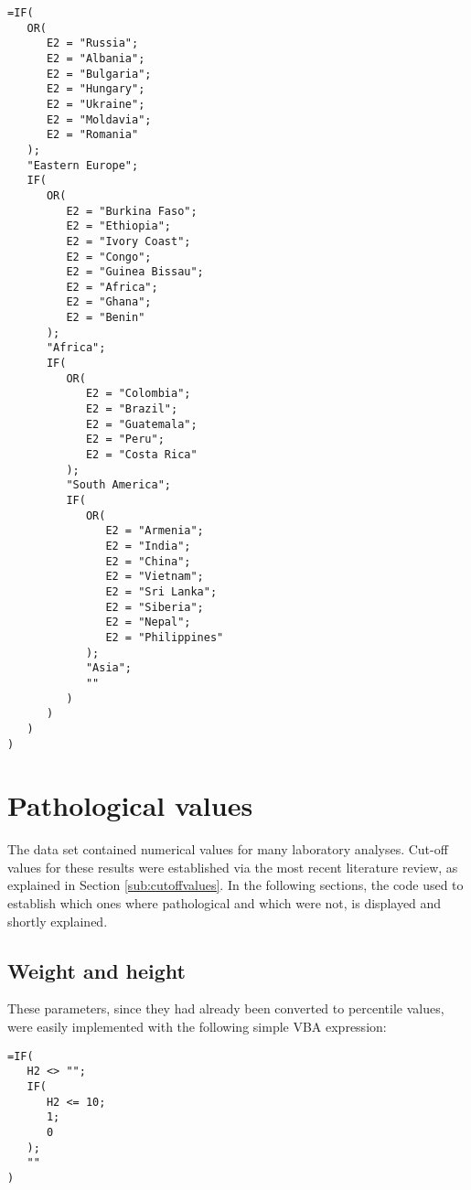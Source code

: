 \begin{lstlisting}
=IF(
   OR(
      E2 = "Russia";
      E2 = "Albania";
      E2 = "Bulgaria";
      E2 = "Hungary";
      E2 = "Ukraine";
      E2 = "Moldavia";
      E2 = "Romania"
   );
   "Eastern Europe";
   IF(
      OR(
         E2 = "Burkina Faso";
         E2 = "Ethiopia";
         E2 = "Ivory Coast";
         E2 = "Congo";
         E2 = "Guinea Bissau";
         E2 = "Africa";
         E2 = "Ghana";
         E2 = "Benin"
      );
      "Africa";
      IF(
         OR(
            E2 = "Colombia";
            E2 = "Brazil";
            E2 = "Guatemala";
            E2 = "Peru";
            E2 = "Costa Rica"
         );
         "South America";
         IF(
            OR(
               E2 = "Armenia";
               E2 = "India";
               E2 = "China";
               E2 = "Vietnam";
               E2 = "Sri Lanka";
               E2 = "Siberia";
               E2 = "Nepal";
               E2 = "Philippines"
            );
            "Asia";
            ""
         )
      )
   )
)
\end{lstlisting}

\section{Pathological values}\label{sec:pathologicalvalues}
The data set contained numerical values for many laboratory analyses. Cut-off values for these results were established via the most recent literature review, as explained in Section \ref{sub:cutoffvalues}. In the following sections, the code used to establish which ones where pathological and which were not, is displayed and shortly explained.

\subsection{Weight and height}\label{sub:patweightandheight}
These parameters, since they had already been converted to percentile values, were easily implemented with the following simple VBA expression:

\begin{minipage}{\linewidth}
\begin{lstlisting}
=IF(
   H2 <> "";
   IF(
      H2 <= 10;
      1;
      0
   );
   ""
)
\end{lstlisting}\
\end{minipage}

